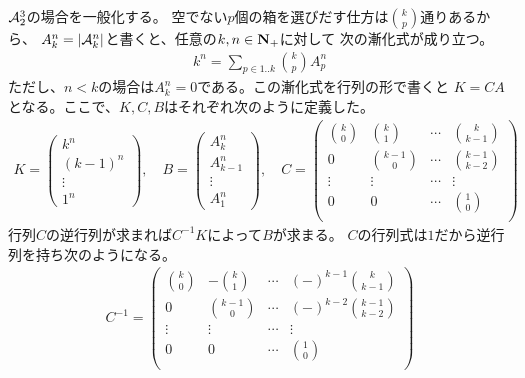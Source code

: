 	${{\mathcal{A}}}_2^3$の場合を一般化する。
	空でない$p$個の箱を選びだす仕方は$\binom{k}{p}$通りあるから、
	$A_k^n=\left|{{{\mathcal{A}}}_k^n}\right|$と書くと、任意の$k,n\in\mathbf{N}_+$に対して
	次の漸化式が成り立つ。
	\begin{equation}\label{eq:空箱ありの仕方の数は空箱なし仕方の数の和}\begin{split} %
		k^n = \sum_{p\in1..k}\binom{k}{p}A_p^n
	\end{split}\end{equation} %
	ただし、$n<k$の場合は$A_k^n=0$である。この漸化式を行列の形で書くと
	$K = CA$となる。ここで、$K,C,B$はそれぞれ次のように定義した。
	\begin{equation*}\begin{split} %
		K = \begin{pmatrix}
			k^n \\ (k-1)^n \\ \vdots \\ 1^n
		\end{pmatrix} 
		,\quad B = \begin{pmatrix}
			A_k^n \\ A_{k-1}^n \\ \vdots \\ A_1^n
		\end{pmatrix}
		,\quad C = \begin{pmatrix}
			\binom{k}{0} & \binom{k}{1} & \cdots & \binom{k}{k-1} \\
			0 & \binom{k-1}{0} & \cdots & \binom{k-1}{k-2} \\
			\vdots & \vdots & \cdots & \vdots \\
			0 & 0 & \cdots & \binom{1}{0} \\
		\end{pmatrix} 
	\end{split}\end{equation*} %
	行列$C$の逆行列が求まれば$C^{-1}K$によって$B$が求まる。
	$C$の行列式は$1$だから逆行列を持ち次のようになる。
	\begin{equation*}\begin{split} %
		C^{-1} = \begin{pmatrix}
			\binom{k}{0} & -\binom{k}{1} & \cdots & (-)^{k-1}\binom{k}{k-1} \\
			0 & \binom{k-1}{0} & \cdots & (-)^{k-2}\binom{k-1}{k-2} \\
			\vdots & \vdots & \cdots & \vdots \\
			0 & 0 & \cdots & \binom{1}{0} \\
		\end{pmatrix}
	\end{split}\end{equation*} %
